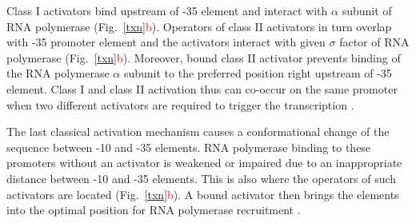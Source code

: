 Class I activators bind upstream of -35 element and interact with $\alpha$ subunit of RNA polymerase \cite{ushida1990helical} (Fig.~\ref{txn}\textcolor{red}{b}).
Operators of class II activators in turn overlap with -35 promoter element and the activators interact with given $\sigma$ factor of RNA polymerase \cite{igarashi1991functional} (Fig.~\ref{txn}\textcolor{red}{b}).
Moreover, bound class II activator prevents binding of the RNA polymerase $\alpha$ subunit to the preferred position right upstream of -35 element.
Class I and class II activation thus can co-occur on the same promoter when two different activators are required to trigger the transcription \cite{lloyd2002requirement}.

The last classical activation mechanism causes a conformational change of the sequence between -10 and -35 elements.
RNA polymerase binding to these promoters without an activator is weakened or impaired due to an inappropriate distance between -10 and -35 elements.
This is also where the operators of such activators are located (Fig.~\ref{txn}\textcolor{red}{b}).
A bound activator then brings the elements into the optimal position for RNA polymerase recruitment \cite{heldwein2001crystal}.


